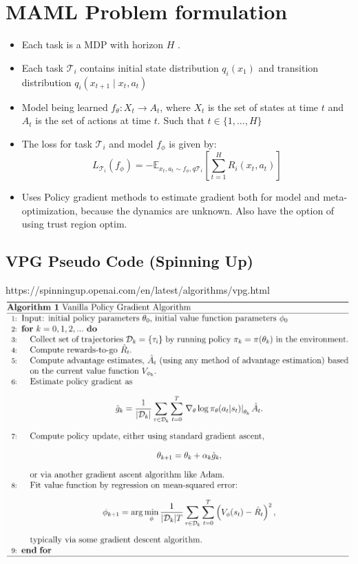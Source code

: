 \documentclass{article}
\theoremstyle{definition}
\theoremstyle{note}
\begin{document}
\section*{MAML Problem formulation}

\begin{itemize}
    \item Each task is a MDP with horizon $ H $ .
    \item Each task $ \mathcal{T} _ {i} $ contains initial 
    state distribution $ q _ {i} (x _ {1}) $ and transition distribution
    $ q _ {i} (x _ {t+1} \mid x _ {t} , a _ {t}) $ 
    \item Model being learned $ f _ {\theta}: X _ {t} \rightarrow A _ {t} $,
    where $X_ {t}$ is the set of states at time $ t $  and $ A _ {t} $  is the set of actions at time $ t $.
    Such that $ t \in \{ 1, ..., H\} $ 
    \item The loss for task $ \mathcal{T} _ {i} $ and model $ f _ {\phi} $ is given by:\\
    \[
    L _ {\mathcal{T} _ {i} } ( f _ {\phi}) = 
    - \mathbb{E} _ {x_ {t}, a _ {t} \sim f _ {\phi}, q \mathcal{T}_ {i}} 
    \left [ \sum \limits _ {t=1} ^ {H} R_ {i} (x _ {t}, a_ {t})\right]
    \]
    \item Uses Policy gradient methods to estimate gradient both for model and meta-optimization, 
    because the dynamics are unknown. Also have the option of using trust region optim.
\end{itemize}


\newpage
\subsection*{VPG Pseudo Code (Spinning Up)}
https://spinningup.openai.com/en/latest/algorithms/vpg.html\\
\includegraphics[scale=0.5]{./vpg.png}\\
\end{document}
